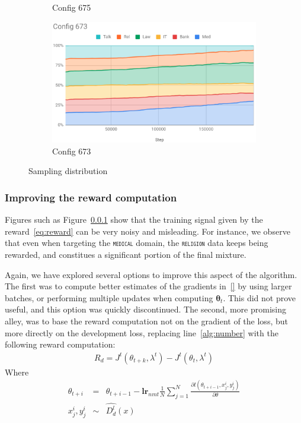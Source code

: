 \documentclass[11pt,a4paper]{article}
\newcommand{\fyTodo}[1]{\Todo[FY:]{\textcolor{orange}{#1}}}
\newcommand{\domain}[1]{\texttt{\textsc{#1}}}
\newcommand{\vtheta}{\ensuremath{\boldsymbol\theta}\xspace} %
\begin{document}
\begin{figure}[htb]
\begin{subfigure}{.5\textwidth}
  \caption{Config 675}
  \label{fig:675}
\end{subfigure}
\begin{subfigure}{.5\textwidth}
  \centering
  \includegraphics[width=.8\linewidth]{config673.png}  
  \caption{Config 673}
  \label{fig:673}
\end{subfigure}
\caption{Sampling distribution}
\label{fig:sampling}
\end{figure}

\subsubsection{Improving the reward computation}

Figures such as Figure~\ref{} show that the training signal given by the reward~\ref{eq:reward} can be very noisy and misleading. For instance, we observe that even when targeting the \domain{medical} domain, the \domain{religion} data keeps being rewarded, and constitues a significant portion of the final mixture.\fyTodo{Which figure, which equation ?}\fyTodo{Do we have number that show variance and strong divergence wrt initial training point ?}

Again, we have explored several options to improve this aspect of the algorithm. The first was to compute better estimates of the gradients in~\eqref{} by using larger batches, or performing multiple updates when computing $\vtheta_t$. This did not prove useful, and this option was quickly discontinued. The second, more promising alley, was to base the reward computation not on the gradient of the loss, but more directly on the development loss, replacing line~\ref{alg:number}\fyTodo{which line ?} with the following reward computation:
\begin{align*}
  R_d = J^t(\theta_{t+k},\lambda^t) - J^t(\theta_t,\lambda^t)
\end{align*}
Where 
\begin{equation}
\begin{array}{rcl}
\theta_{t+i} &=& \theta_{t+i-1} - \mathbf{lr}_{nmt} \frac{1}{N}\displaystyle{\mathop{\sum}_{j=1}^N}\frac{\partial l(\theta_{t+i-1}, x^i_j,y^i_j)}{\partial \theta} \\
x^i_j, y^i_j &\sim& \widehat{D^l_d}(x)
\end{array}
\end{equation}
\end{document}
